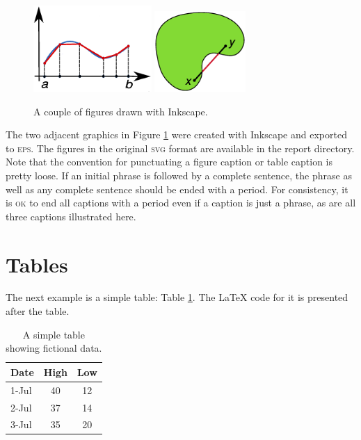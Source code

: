 {\begin{figure}[ht]
\label{fig2}
\begin{center}
\includegraphics[width=0.4\textwidth]{Graphics/Figure1.eps}
\includegraphics[width=0.309\textwidth]{Graphics/Figure2.eps}
\end{center}
\caption{A couple of figures drawn with Inkscape.}\label{FIGURE:fromInkScape}
\end{figure}

The two adjacent graphics in Figure \ref{FIGURE:fromInkScape} were created with Inkscape and exported to \textsc{eps}.
The figures in the original \textsc{svg} format are available in the report directory.
Note that the convention for punctuating a figure caption or table caption is pretty loose.
If an initial phrase is followed by a complete sentence, the phrase as well as any complete sentence should be ended with a period.
For consistency, it is \textsc{ok} to end all captions with a period even if a caption is just a phrase, as are all three captions illustrated here.

\section{Tables}

\noindent The next example is a simple table: Table \ref{TABLE:Simple}.
The {\LaTeX} code for it is presented after the table. 

\begin{table}[h]
\begin{center}
  \begin{tabular}{|lcc|}
    \hline
    Date & High & Low\\ \hline
    1-Jul & 40 & 12\\
    2-Jul & 37 & 14\\
    3-Jul & 35 & 20\\ \hline
  \end{tabular}
\end{center}
\caption{A simple table showing fictional data.}\label{TABLE:Simple}
\end{table}

}
